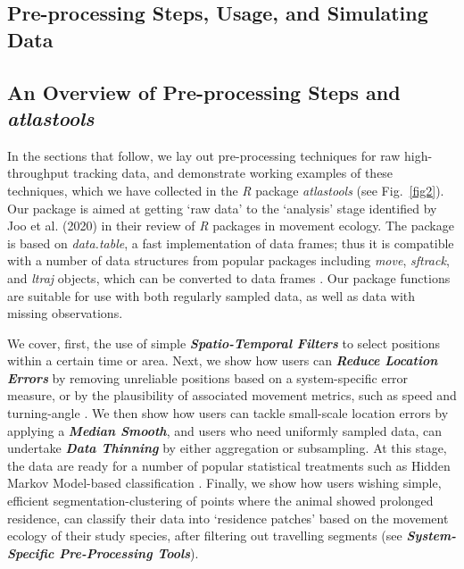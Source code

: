 \begin{refsection}[sorting=nyt]
    \section*{Pre-processing Steps, Usage, and Simulating Data}

    \subsection*{An Overview of Pre-processing Steps and \textit{atlastools}}

    In the sections that follow, we lay out pre-processing techniques for raw high-throughput tracking data, and demonstrate working examples of these techniques, which we have collected in the \textit{R} package \textit{atlastools} (see Fig.~\ref{fig2}).
    Our package is aimed at getting `raw data' to the `analysis' stage identified by Joo et al. (2020) in their review of \textit{R} packages in movement ecology.
    The package is based on \textit{data.table}, a fast implementation of data frames; thus it is compatible with a number of data structures from popular packages including \textit{move}, \textit{sftrack}, and \textit{ltraj} objects, which can be converted to data frames \citep[][]{kranstauber2011,boone2020,calenge2009}.
    Our package functions are suitable for use with both regularly sampled data, as well as data with missing observations.

    We cover, first, the use of simple \textit{\textbf{Spatio-Temporal Filters}} to select positions within a certain time or area.
    Next, we show how users can \textit{\textbf{Reduce Location Errors}} by removing unreliable positions based on a system-specific error measure, or by the plausibility of associated movement metrics, such as speed and turning-angle \citep{seidel2018, calenge2009}.
    We then show how users can tackle small-scale location errors by applying a \textit{\textbf{Median Smooth}}, and users who need uniformly sampled data, can undertake \textit{\textbf{Data Thinning}} by either aggregation or subsampling.
    At this stage, the data are ready for a number of popular statistical treatments such as Hidden Markov Model-based classification \citep{michelot2016,langrock2012}.
    Finally, we show how users wishing simple, efficient segmentation-clustering of points where the animal showed prolonged residence, can classify their data into `residence patches' \citep{barraquand2008, bijleveld2016} based on the movement ecology of their study species, after filtering out travelling segments (see \textit{\textbf{System-Specific Pre-Processing Tools}}).


\end{refsection}
